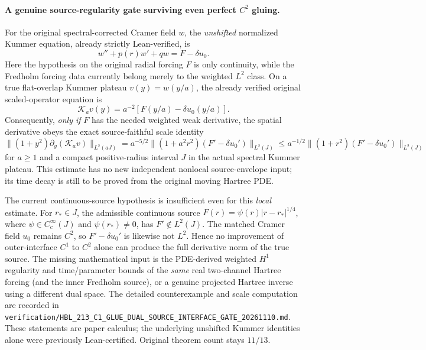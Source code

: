\documentclass[11pt]{amsart}
\begin{document}
\paragraph{A genuine source-regularity gate surviving even perfect \(C^2\) gluing.}
For the original spectral-corrected Cramer field \(w\), the
\emph{unshifted} normalized Kummer equation, already strictly
Lean-verified, is
\[
 w''+p(r)w'+q w=F-\delta u_0.
\]
Here the hypothesis on the original radial forcing \(F\)
is only continuity, while the Fredholm forcing data
currently belong merely to the weighted \(L^2\) class.
On a true flat-overlap Kummer plateau
\(v(y)=w(y/a)\), the already verified original
scaled-operator equation is
\[
 \mathcal K_a v(y)=a^{-2}
    [F(y/a)-\delta u_0(y/a)].
\]
Consequently, \emph{only if} \(F\) has the needed
weighted weak derivative, the spatial derivative obeys
the exact source-faithful scale identity
\[
 \bigl\|(1+y^2)\partial_y(\mathcal K_a v)\bigr\|_{L^2(aJ)}
 =a^{-5/2}\bigl\|(1+a^2r^2)(F'-\delta u_0')\bigr\|_{L^2(J)}
 \le a^{-1/2}\bigl\|(1+r^2)(F'-\delta u_0')\bigr\|_{L^2(J)}
\]
for \(a\ge1\) and a compact positive-radius interval \(J\)
in the actual spectral Kummer plateau. This estimate
has no new independent nonlocal source-envelope input;
its time decay is still to be proved from the original
moving Hartree PDE.

The current continuous-source hypothesis is
insufficient even for this \emph{local} estimate.
For \(r_*\in J\), the admissible continuous source
\(F(r)=\psi(r)|r-r_*|^{1/4}\), where
\(\psi\in C_c^\infty(J)\) and \(\psi(r_*)\ne0\),
has \(F'\notin L^2(J)\). The matched Cramer field
\(u_0\) remains \(C^2\), so \(F'-\delta u_0'\)
is likewise not \(L^2\). Hence no improvement
of outer-interface \(C^1\) to \(C^2\) alone can
produce the full derivative norm of the true source.
The missing mathematical input is the
PDE-derived weighted \(H^1\) regularity and
time/parameter bounds of the \emph{same}
real two-channel Hartree forcing (and the inner
Fredholm source), or a genuine projected Hartree
inverse using a different dual space.
The detailed counterexample and scale computation
are recorded in
\texttt{verification/HBL\_213\_C1\_GLUE\_DUAL\_SOURCE\_INTERFACE\_GATE\_20261110.md}.
These statements are paper calculus; the underlying
unshifted Kummer identities alone were previously
Lean-certified. Original theorem count stays \(11/13\).
\end{document}
